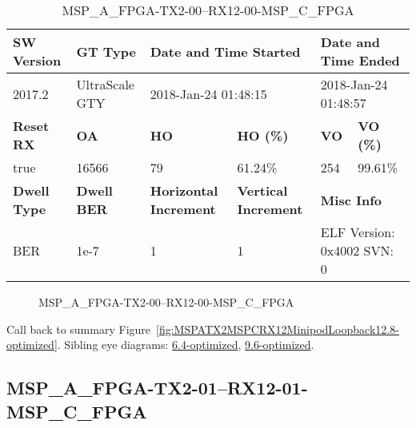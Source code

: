 \begin{table}[h]
\centering
\caption{MSP\_A\_FPGA-TX2-00--RX12-00-MSP\_C\_FPGA}
\label{tab:MSPAFPGATX200RX1200MSPCFPGA12.8-optimized}
\begin{tabular}{@{}|l|l|l|l|l|l|@{}}
\toprule
\textbf{SW Version}                & \textbf{GT Type}   & \multicolumn{2}{l|}{\textbf{Date and Time Started}}            & \multicolumn{2}{l|}{\textbf{Date and Time Ended}}        \\ \midrule
2017.2                       & UltraScale GTY          & \multicolumn{2}{l|}{2018-Jan-24 01:48:15}                   & \multicolumn{2}{l|}{2018-Jan-24 01:48:57}               \\ \midrule
\textbf{Reset RX}                  & \textbf{OA} & \textbf{HO}   & \textbf{HO (\%)} & \textbf{VO} & \textbf{VO (\%)} \\ \midrule
true & 16566        & 79          & 61.24\%        & 254        & 99.61\%       \\ \midrule
\textbf{Dwell Type}                & \textbf{Dwell BER} & \textbf{Horizontal Increment} & \textbf{Vertical Increment}    & \multicolumn{2}{l|}{\textbf{Misc Info}}                  \\ \midrule
BER                            & 1e-7        & 1        & 1           & \multicolumn{2}{l|}{ELF Version: 0x4002 SVN: 0}                         \\ \bottomrule
\end{tabular}
\end{table}

\begin{figure}[h]
\caption{MSP\_A\_FPGA-TX2-00--RX12-00-MSP\_C\_FPGA} \label{fig:MSPAFPGATX200RX1200MSPCFPGA12.8-optimized}
\end{figure}

Call back to summary Figure~\ref{fig:MSPATX2MSPCRX12MinipodLoopback12.8-optimized}.
Sibling eye diagrams: \hyperref[sec:MSPAFPGATX200RX1200MSPCFPGA6.4-optimized]{6.4-optimized}, \hyperref[sec:MSPAFPGATX200RX1200MSPCFPGA9.6-optimized]{9.6-optimized}.

\clearpage
\newpage


\subsection{MSP\_A\_FPGA-TX2-01--RX12-01-MSP\_C\_FPGA}\label{sec:MSPAFPGATX201RX1201MSPCFPGA12.8-optimized}

